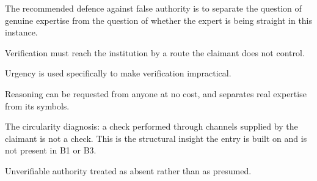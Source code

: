 

\begin{distilled}
  \item The recommended defence against false authority is to separate the question of genuine expertise from the question of whether the expert is being straight in this instance.
  \item Verification must reach the institution by a route the claimant does not control.
  \item Urgency is used specifically to make verification impractical.
  \item Reasoning can be requested from anyone at no cost, and separates real expertise from its symbols.
\end{distilled}

\begin{unique}
  \item The circularity diagnosis: a check performed through channels supplied by the claimant is not a check. This is the structural insight the entry is built on and is not present in B1 or B3.
  \item Unverifiable authority treated as absent rather than as presumed.
\end{unique}
